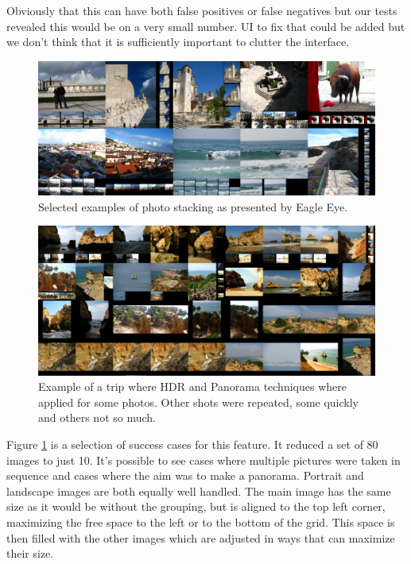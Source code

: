 Obviously that this can have both false positives or false negatives but our tests revealed this would be on a very small number. \ac{UI} to fix that could be added but we don't think that it is sufficiently important to clutter the interface.

\begin{figure}[htbp]
	\centering
		\includegraphics[width=\linewidth]{Figures/stacks-motives.png}
	\caption{Selected examples of photo stacking as presented by Eagle Eye.}
	\label{fig:stacks1}
\end{figure}

\begin{figure}[htbp]
	\centering
		\includegraphics[width=\linewidth]{Figures/stacks-mix.png}
	\caption{Example of a trip where \ac{HDR} and Panorama techniques where applied for some photos. Other shots were repeated, some quickly and others not so much.}
	\label{fig:stacks2}
\end{figure}

Figure \ref{fig:stacks1} is a selection of success cases for this feature. It reduced a set of 80 images to just 10. It's possible to see cases where multiple pictures were taken in sequence and cases where the aim was to make a panorama. Portrait and landscape images are both equally well handled. The main image has the same size as it would be without the grouping, but is aligned to the top left corner, maximizing the free space to the left or to the bottom of the grid. This space is then filled with the other images which are adjusted in ways that can maximize their size.

